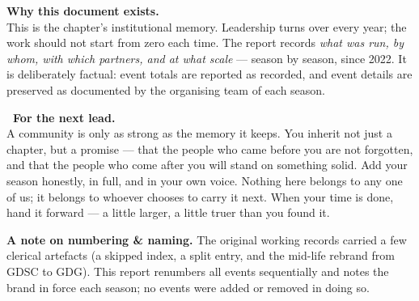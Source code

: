 \documentclass[11pt,a4paper]{article}
\begin{document}
\vspace{4pt}
\begin{tcolorbox}[enhanced,colback=Mist,colframe=Mist,arc=4pt,left=14pt,right=14pt,top=10pt,bottom=10pt,
    borderline west={3pt}{0pt}{GBlue}]
  {\bfseries\color{Ink}Why this document exists.}\\[2pt]
  This is the chapter's institutional memory. Leadership turns over every year; the work should not
  start from zero each time. The report records \emph{what was run, by whom, with which partners, and
  at what scale} — season by season, since 2022. It is deliberately factual: event totals are
  reported as recorded, and event details are preserved as documented by the organising
  team of each season.
\end{tcolorbox}

\begin{tcolorbox}[enhanced,colback=white,colframe=GGrn,boxrule=1pt,arc=4pt,
    left=14pt,right=14pt,top=10pt,bottom=10pt]
  {\bfseries\color{GGrn}\faArrowRight~For the next lead.}\\[2pt]
  A community is only as strong as the memory it keeps. You inherit not just a chapter, but a
  promise — that the people who came before you are not forgotten, and that the people who come
  after you will stand on something solid. Add your season honestly, in full, and in your own voice.
  Nothing here belongs to any one of us; it belongs to whoever chooses to carry it next. When your
  time is done, hand it forward — a little larger, a little truer than you found it.
\end{tcolorbox}

\vspace{6pt}
{\footnotesize\color{Slate}\textbf{A note on numbering \& naming.} The original working records
carried a few clerical artefacts (a skipped index, a split entry, and the mid-life rebrand from
GDSC to GDG). This report renumbers all events sequentially and notes the brand in force each
season; no events were added or removed in doing so.}
\clearpage


\end{document}
